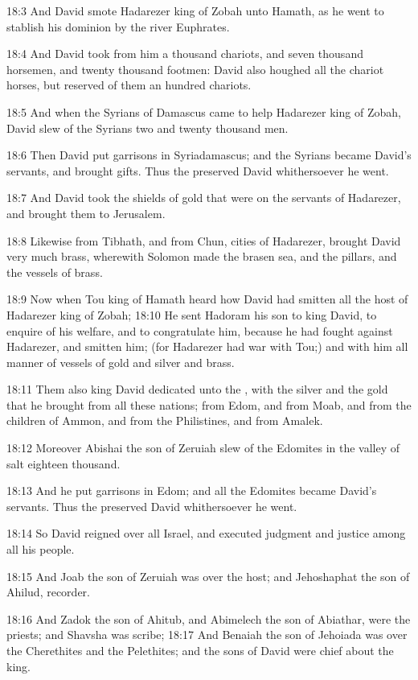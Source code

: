 18:3 And David smote Hadarezer king of Zobah unto Hamath, as he went to stablish his dominion by the river Euphrates.

18:4 And David took from him a thousand chariots, and seven thousand horsemen, and twenty thousand footmen: David also houghed all the chariot horses, but reserved of them an hundred chariots.

18:5 And when the Syrians of Damascus came to help Hadarezer king of Zobah, David slew of the Syrians two and twenty thousand men.

18:6 Then David put garrisons in Syriadamascus; and the Syrians became David's servants, and brought gifts. Thus the \LORD preserved David whithersoever he went.

18:7 And David took the shields of gold that were on the servants of Hadarezer, and brought them to Jerusalem.

18:8 Likewise from Tibhath, and from Chun, cities of Hadarezer, brought David very much brass, wherewith Solomon made the brasen sea, and the pillars, and the vessels of brass.

18:9 Now when Tou king of Hamath heard how David had smitten all the host of Hadarezer king of Zobah; 18:10 He sent Hadoram his son to king David, to enquire of his welfare, and to congratulate him, because he had fought against Hadarezer, and smitten him; (for Hadarezer had war with Tou;) and with him all manner of vessels of gold and silver and brass.

18:11 Them also king David dedicated unto the \LORD, with the silver and the gold that he brought from all these nations; from Edom, and from Moab, and from the children of Ammon, and from the Philistines, and from Amalek.

18:12 Moreover Abishai the son of Zeruiah slew of the Edomites in the valley of salt eighteen thousand.

18:13 And he put garrisons in Edom; and all the Edomites became David's servants. Thus the \LORD preserved David whithersoever he went.

18:14 So David reigned over all Israel, and executed judgment and justice among all his people.

18:15 And Joab the son of Zeruiah was over the host; and Jehoshaphat the son of Ahilud, recorder.

18:16 And Zadok the son of Ahitub, and Abimelech the son of Abiathar, were the priests; and Shavsha was scribe; 18:17 And Benaiah the son of Jehoiada was over the Cherethites and the Pelethites; and the sons of David were chief about the king.

